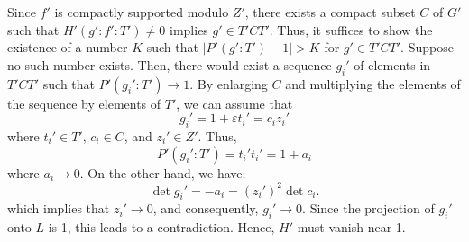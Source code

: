 Since $f'$ is compactly supported modulo $Z'$, there exists a compact subset $C$ of $G'$ such that $H'(g':f':T') \neq 0$ implies $g' \in T'CT'$.
Thus, it suffices to show the existence of a number $K$ such that $|P'(g':T') - 1| > K$ for $g' \in T'CT'$.
Suppose no such number exists. Then, there would exist a sequence $g_i'$ of elements in $T'CT'$ such that $P'(g_i':T') \to 1$. By enlarging $C$ and multiplying the elements of the sequence by elements of $T'$, we can assume that
\[
g_i' = 1 + \varepsilon t_i' = c_i z_i'
\]
where $t_i' \in T'$, $c_i \in C$, and $z_i' \in Z'$. Thus,
\[
P'(g_i':T') = t_i' \bar{t}_i' = 1 + a_i
\]
where $a_i \to 0$.
On the other hand, we have:
\[
\det g_i' = -a_i = {(z_i')}^2 \det c_i.
\]
which implies that $z_i' \to 0$, and consequently, $g_i' \to 0$. Since the projection of $g_i'$ onto $L$ is 1, this leads to a contradiction. Hence, $H'$ must vanish near 1.


